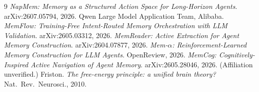 \documentclass[11pt]{article}
\begin{document}
\begin{thebibliography}{9}
 \emph{NapMem: Memory as a Structured Action Space for Long-Horizon Agents}. arXiv:2607.05794, 2026. Qwen Large Model Application Team, Alibaba.
 \emph{MemFlow: Training-Free Intent-Routed Memory Orchestration with LLM Validation}. arXiv:2605.03312, 2026.
 \emph{MemReader: Active Extraction for Agent Memory Construction}. arXiv:2604.07877, 2026.
 \emph{Mem-$\alpha$: Reinforcement-Learned Memory Construction for LLM Agents}. OpenReview, 2026.
 \emph{MemCog: Cognitively-Inspired Active Navigation of Agent Memory}. arXiv:2605.28046, 2026. (Affiliation unverified.)
 Friston. \emph{The free-energy principle: a unified brain theory?} Nat.\ Rev.\ Neurosci., 2010.
\end{thebibliography}
\end{document}

